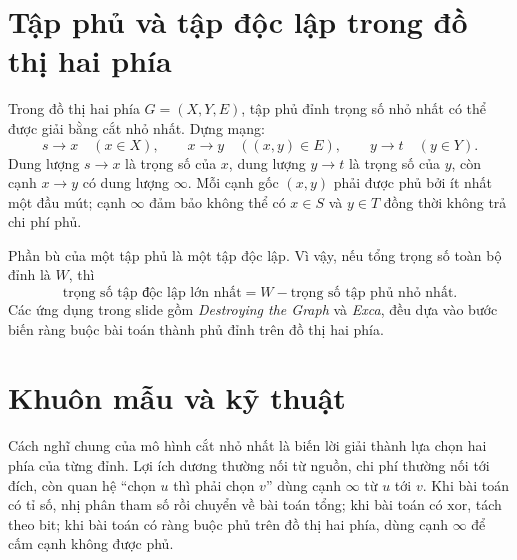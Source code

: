 \documentclass[11pt]{article}
\newcommand{\INF}{\infty}
\newcommand{\xor}{\mathbin{\mathrm{xor}}}
\begin{document}
\section{Tập phủ và tập độc lập trong đồ thị hai phía}

Trong đồ thị hai phía \(G=(X,Y,E)\), tập phủ đỉnh trọng số nhỏ nhất có thể
được giải bằng cắt nhỏ nhất. Dựng mạng:
\[
  s\to x\quad(x\in X),\qquad x\to y\quad((x,y)\in E),\qquad y\to t\quad(y\in Y).
\]
Dung lượng \(s\to x\) là trọng số của \(x\), dung lượng \(y\to t\) là trọng
số của \(y\), còn cạnh \(x\to y\) có dung lượng \(\INF\). Mỗi cạnh gốc
\((x,y)\) phải được phủ bởi ít nhất một đầu mút; cạnh \(\INF\) đảm bảo không
thể có \(x\in S\) và \(y\in T\) đồng thời không trả chi phí phủ.

Phần bù của một tập phủ là một tập độc lập. Vì vậy, nếu tổng trọng số toàn bộ
đỉnh là \(W\), thì
\[
  \text{trọng số tập độc lập lớn nhất}
  =W-\text{trọng số tập phủ nhỏ nhất}.
\]
Các ứng dụng trong slide gồm \textit{Destroying the Graph} và \textit{Exca},
đều dựa vào bước biến ràng buộc bài toán thành phủ đỉnh trên đồ thị hai phía.

\section{Khuôn mẫu và kỹ thuật}

Cách nghĩ chung của mô hình cắt nhỏ nhất là biến lời giải thành lựa chọn hai
phía của từng đỉnh. Lợi ích dương thường nối từ nguồn, chi phí thường nối tới
đích, còn quan hệ ``chọn \(u\) thì phải chọn \(v\)'' dùng cạnh \(\INF\) từ
\(u\) tới \(v\). Khi bài toán có tỉ số, nhị phân tham số rồi chuyển về bài
toán tổng; khi bài toán có \(\xor\), tách theo bit; khi bài toán có ràng buộc
phủ trên đồ thị hai phía, dùng cạnh \(\INF\) để cấm cạnh không được phủ.
\end{document}
